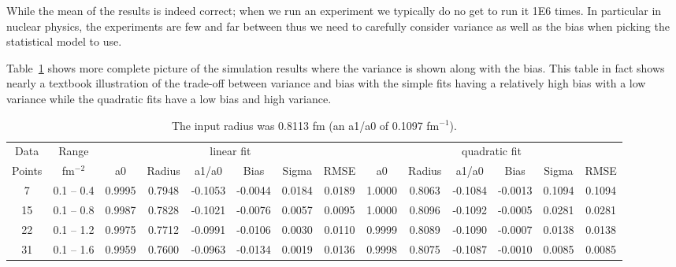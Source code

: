 \documentclass[10pt,aps,prc,twocolumn]{revtex4-1}
\begin{document}
While the mean of the results is indeed correct; when we run an experiment we typically do no get to run it 1E6 times.
In particular in nuclear physics, the experiments are few and far between thus we need to carefully consider variance as
well as the bias when picking the statistical model to use.

Table~\ref{fulltable} shows more complete picture of the simulation results where the variance is shown along with the bias.
This table in fact shows nearly a textbook illustration of the trade-off between variance and bias with the simple fits
having a relatively high bias with a low variance while the quadratic fits have a low bias and high variance.

\begin{table}
\label{fulltable}
\caption{The input radius was 0.8113 fm (an a1/a0 of 0.1097 fm$^{-1}$).}
\begin{tabular}{cc|cccccc|cccccc} \hline
Data   & Range     & \multicolumn{6}{c|}{linear fit}                       & \multicolumn{6}{c}{quadratic fit}                    \\ 
Points & fm$^{-2}$ &   a0  & Radius&  a1/a0 &  Bias  & Sigma &  RMSE  &   a0  & Radius& a1/a0  &  Bias  & Sigma &  RMSE \\  \hline
7      & 0.1 -- 0.4 & 0.9995& 0.7948& -0.1053& -0.0044& 0.0184& 0.0189 & 1.0000& 0.8063& -0.1084& -0.0013& 0.1094& 0.1094\\
15     & 0.1 -- 0.8 & 0.9987& 0.7828& -0.1021& -0.0076& 0.0057& 0.0095 & 1.0000& 0.8096& -0.1092& -0.0005& 0.0281& 0.0281\\
22     & 0.1 -- 1.2 & 0.9975& 0.7712& -0.0991& -0.0106& 0.0030& 0.0110 & 0.9999& 0.8089& -0.1090& -0.0007& 0.0138& 0.0138\\
31     & 0.1 -- 1.6 & 0.9959& 0.7600& -0.0963& -0.0134& 0.0019& 0.0136 & 0.9998& 0.8075& -0.1087& -0.0010& 0.0085& 0.0085\\ \hline
\end{tabular}
\end{table}
\end{document}
